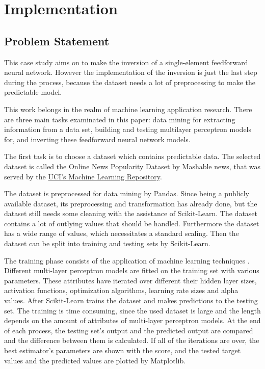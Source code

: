 \chapter{Implementation}

\section{Problem Statement}

This case study aims on to make the inversion of a single-element feedforward neural network. However the implementation of the inversion is just the last step during the process, because the dataset needs a lot of preprocessing to make the predictable model.\smallskip

This work belongs in the realm of machine learning application research. There are three main tasks examinated in this paper: data mining for extracting information from a data set, building and testing multilayer perceptron models for, and inverting these feedforward neural network models. \medskip

The first task is to choose a dataset which contains predictable data. The selected dataset is called the Online News Popularity Dataset by Mashable news, that was served by the  \href{http://archive.ics.uci.edu/ml/datasets/Online+News+Popularity}{UCI's Machine Learning Repository}. \smallskip

The dataset is preprocessed for data mining by Pandas. Since being a publicly available dataset, its preprocessing and transformation has already done, but the dataset still needs some cleaning with the assistance of Scikit-Learn. The dataset contains a lot of outlying values that should be handled. Furthermore the dataset has a wide range of values, which necessitates a standard scaling. Then the dataset can be split into training and testing sets by Scikit-Learn. \medskip

The training phase consists of the application of machine learning techniques \cite{karayiannis2013artificial}. Different multi-layer perceptron models are fitted on the training set with various parameters. These attributes have iterated over different their hidden layer sizes, activation functions, optimization algorithms, learning rate sizes and alpha values. After Scikit-Learn trains the dataset and makes predictions to the testing set. The training is time consuming, since the used dataset is large and the length depends on the amount of attributes of multi-layer perceptron models. At the end of each process, the testing set's output and the predicted output are compared and the difference between them is calculated. If all of the iterations are over, the best estimator's parameters are shown with the score, and the tested target values and the predicted values are plotted by Matplotlib.\medskip

